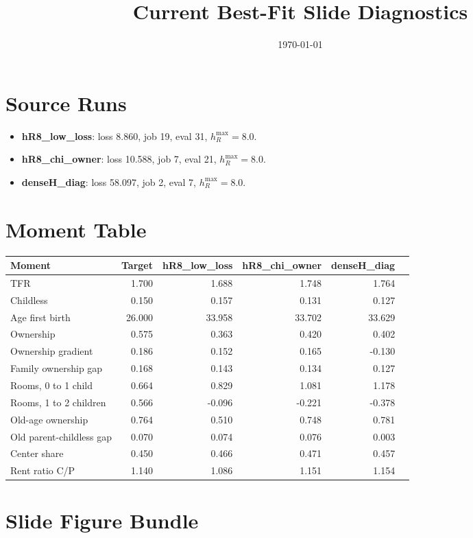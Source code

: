 \documentclass[11pt]{article}
\title{Current Best-Fit Slide Diagnostics}
\date{\today}
\begin{document}
\maketitle
\section*{Source Runs}
\begin{itemize}
\item \textbf{hR8\_low\_loss}: loss 8.860, job 19, eval 31, $h_R^{\max}=8.0$.
\item \textbf{hR8\_chi\_owner}: loss 10.588, job 7, eval 21, $h_R^{\max}=8.0$.
\item \textbf{denseH\_diag}: loss 58.097, job 2, eval 7, $h_R^{\max}=8.0$.
\end{itemize}
\section*{Moment Table}
\begin{table}[H]\centering\small
\begin{tabular}{lrrrrr}
\toprule
Moment & Target & hR8\_low\_loss & hR8\_chi\_owner & denseH\_diag \\
\midrule
TFR & 1.700 & 1.688 & 1.748 & 1.764 \\
Childless & 0.150 & 0.157 & 0.131 & 0.127 \\
Age first birth & 26.000 & 33.958 & 33.702 & 33.629 \\
Ownership & 0.575 & 0.363 & 0.420 & 0.402 \\
Ownership gradient & 0.186 & 0.152 & 0.165 & -0.130 \\
Family ownership gap & 0.168 & 0.143 & 0.134 & 0.127 \\
Rooms, 0 to 1 child & 0.664 & 0.829 & 1.081 & 1.178 \\
Rooms, 1 to 2 children & 0.566 & -0.096 & -0.221 & -0.378 \\
Old-age ownership & 0.764 & 0.510 & 0.748 & 0.781 \\
Old parent-childless gap & 0.070 & 0.074 & 0.076 & 0.003 \\
Center share & 0.450 & 0.466 & 0.471 & 0.457 \\
Rent ratio C/P & 1.140 & 1.086 & 1.151 & 1.154 \\
\bottomrule
\end{tabular}
\end{table}
\section*{Slide Figure Bundle}
\end{document}
